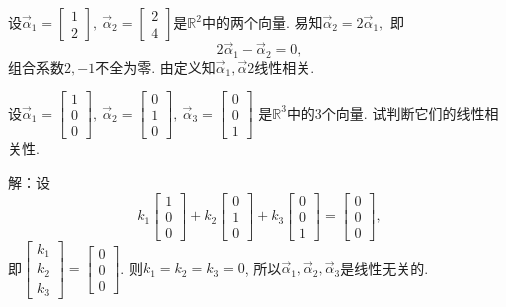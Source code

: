 \begin{eg}
设$\vec{\alpha}_1=\begin{bmatrix}1\\2\end{bmatrix},\ \vec{\alpha}_2=\begin{bmatrix}2\\4\end{bmatrix}$是$\mathbb{R}^2$中的两个向量. 易知$\vec{\alpha}_2=2\vec{\alpha}_1,$ 即$$2\vec{\alpha}_1-\vec{\alpha}_2=0,$$
组合系数$2,-1$不全为零. 由定义知$\vec{\alpha}_1,\vec{\alpha}2$线性相关.
\end{eg}

\begin{eg}
设$\vec{\alpha}_1=\begin{bmatrix}1\\0\\0\end{bmatrix},\ \vec{\alpha}_2=\begin{bmatrix}0\\1\\0\end{bmatrix},\ \vec{\alpha}_3=\begin{bmatrix}0\\0\\1\end{bmatrix}$ 是$\mathbb{R}^3$中的3个向量. 试判断它们的线性相关性.
\end{eg}
解：设$$k_1\begin{bmatrix}1\\0\\0\end{bmatrix}+k_2\begin{bmatrix}0\\1\\0\end{bmatrix}
 +k_3\begin{bmatrix}0\\0\\1\end{bmatrix}=\begin{bmatrix}0\\0\\0\end{bmatrix},$$
 即$\begin{bmatrix}k_1\\k_2\\k_3\end{bmatrix}=\begin{bmatrix}0\\0\\0\end{bmatrix}$. 则$k_1=k_2=k_3=0$, 所以$\vec{\alpha}_1,\vec{\alpha}_2,\vec{\alpha}_3$是线性无关的.


